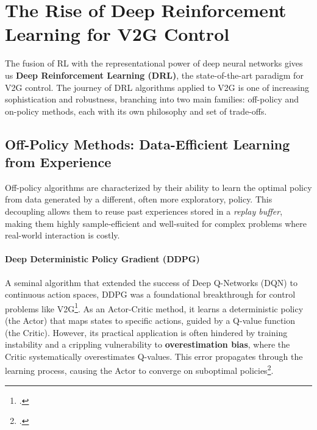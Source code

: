


\section{The Rise of Deep Reinforcement Learning for V2G Control}
The fusion of RL with the representational power of deep neural networks gives us \textbf{Deep Reinforcement Learning (DRL)}, the state-of-the-art paradigm for V2G control. The journey of DRL algorithms applied to V2G is one of increasing sophistication and robustness, branching into two main families: off-policy and on-policy methods, each with its own philosophy and set of trade-offs.

\subsection{Off-Policy Methods: Data-Efficient Learning from Experience}
Off-policy algorithms are characterized by their ability to learn the optimal policy from data generated by a different, often more exploratory, policy. This decoupling allows them to reuse past experiences stored in a \textit{replay buffer}, making them highly sample-efficient and well-suited for complex problems where real-world interaction is costly.

\paragraph{Deep Deterministic Policy Gradient (DDPG)}
A seminal algorithm that extended the success of Deep Q-Networks (DQN) to continuous action spaces, DDPG was a foundational breakthrough for control problems like V2G\footcite{lillicrap2015continuous}. As an Actor-Critic method, it learns a deterministic policy (the Actor) that maps states to specific actions, guided by a Q-value function (the Critic). However, its practical application is often hindered by training instability and a crippling vulnerability to \textbf{overestimation bias}, where the Critic systematically overestimates Q-values. This error propagates through the learning process, causing the Actor to converge on suboptimal policies\footcite{orfanoudakis2022deep, alfaverh2022optima}.

